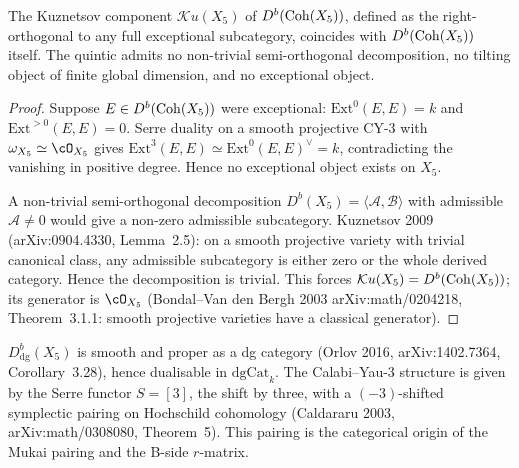 \begin{proposition}
\label{prop:cy-c-quintic-kuznetsov-full}
The Kuznetsov component $\mathcal{K}u(X_5)$ of $D^b(\mathrm{Coh}(X_5))$, defined
as the right-orthogonal to any full exceptional subcategory, coincides
with $D^b(\mathrm{Coh}(X_5))$ itself. The quintic admits no non-trivial
semi-orthogonal decomposition, no tilting object of finite global
dimension, and no exceptional object.
\end{proposition}

\begin{proof}
Suppose $E \in D^b(\mathrm{Coh}(X_5))$ were exceptional:
$\mathrm{Ext}^0(E, E) = k$ and $\mathrm{Ext}^{>0}(E, E) = 0$. Serre
duality on a smooth projective CY-$3$ with $\omega_{X_5} \simeq \cO_{X_5}$
gives $\mathrm{Ext}^3(E, E) \simeq \mathrm{Ext}^0(E, E)^\vee = k$,
contradicting the vanishing in positive degree. Hence no exceptional
object exists on $X_5$.

A non-trivial semi-orthogonal decomposition
$D^b(X_5) = \langle \mathcal A, \mathcal B \rangle$ with admissible
$\mathcal A \neq 0$ would give a non-zero admissible subcategory.
Kuznetsov 2009 (arXiv:0904.4330, Lemma~2.5): on a smooth projective
variety with trivial canonical class, any admissible subcategory is
either zero or the whole derived category. Hence the decomposition is
trivial. This forces $\mathcal{K}u(X_5) = D^b(\mathrm{Coh}(X_5))$; its
generator is $\cO_{X_5}$ (Bondal--Van den Bergh 2003
arXiv:math/0204218, Theorem~3.1.1: smooth projective varieties have a
classical generator).
\end{proof}

\begin{remark}
\label{rem:cy-c-quintic-generator}
$D^b_{\mathrm{dg}}(X_5)$ is smooth and proper as a dg category
(Orlov 2016, arXiv:1402.7364, Corollary~3.28), hence dualisable in
$\mathrm{dgCat}_k$. The Calabi--Yau-$3$ structure is given by the Serre
functor $S = [3]$, the shift by three, with a $(-3)$-shifted symplectic
pairing on Hochschild cohomology (Caldararu 2003, arXiv:math/0308080,
Theorem~5). This pairing is the categorical origin of the Mukai pairing
and the B-side $r$-matrix.
\end{remark}

